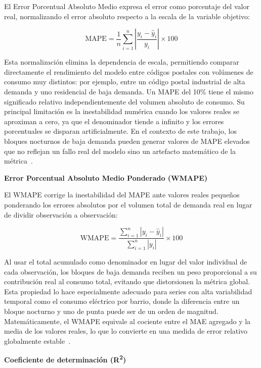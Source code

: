 \documentclass[12pt, a4paper]{article}
\begin{document}
El Error Porcentual Absoluto Medio expresa el error como porcentaje del valor real, normalizando el error absoluto respecto a la escala de la variable objetivo:

\begin{equation}
\text{MAPE} = \frac{1}{n} \sum_{i=1}^{n} \left| \frac{y_i - \hat{y}_i}{y_i} \right| \times 100
\end{equation}

Esta normalización elimina la dependencia de escala, permitiendo comparar directamente el rendimiento del modelo entre códigos postales con volúmenes de consumo muy distintos: por ejemplo, entre un código postal industrial de alta demanda y uno residencial de baja demanda. Un MAPE del 10\% tiene el mismo significado relativo independientemente del volumen absoluto de consumo. Su principal limitación es la inestabilidad numérica cuando los valores reales se aproximan a cero, ya que el denominador tiende a infinito y los errores porcentuales se disparan artificialmente. En el contexto de este trabajo, los bloques nocturnos de baja demanda pueden generar valores de MAPE elevados que no reflejan un fallo real del modelo sino un artefacto matemático de la métrica~\cite{gassar2024, rubattu2023}.

\textbf{Error Porcentual Absoluto Medio Ponderado (WMAPE)}

El WMAPE corrige la inestabilidad del MAPE ante valores reales pequeños ponderando los errores absolutos por el volumen total de demanda real en lugar de dividir observación a observación:

\begin{equation}
\text{WMAPE} = \frac{\sum_{i=1}^{n} |y_i - \hat{y}_i|}{\sum_{i=1}^{n} |y_i|} \times 100
\end{equation}

Al usar el total acumulado como denominador en lugar del valor individual de cada observación, los bloques de baja demanda reciben un peso proporcional a su contribución real al consumo total, evitando que distorsionen la métrica global. Esta propiedad lo hace especialmente adecuado para series con alta variabilidad temporal como el consumo eléctrico por barrio, donde la diferencia entre un bloque nocturno y uno de punta puede ser de un orden de magnitud. Matemáticamente, el WMAPE equivale al cociente entre el MAE agregado y la media de los valores reales, lo que lo convierte en una medida de error relativo globalmente estable~\cite{gassar2024, rubattu2023}.

\textbf{Coeficiente de determinación (R\textsuperscript{2})}
\end{document}
